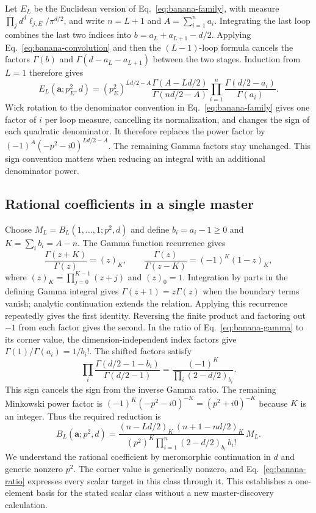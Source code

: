 Let $E_L$ be the Euclidean version of Eq.~\eqref{eq:banana-family}, with
measure $\prod_j d^d\ell_{j,E}/\pi^{d/2}$, and write $n=L+1$ and
$A=\sum_{i=1}^{n}a_i$. Integrating the last loop combines
the last two indices into $b=a_L+a_{L+1}-d/2$. Applying
Eq.~\eqref{eq:banana-convolution} and then the $(L-1)$-loop formula cancels
the factors $\Gamma(b)$ and $\Gamma(d-a_L-a_{L+1})$ between the two stages.
Induction from $L=1$ therefore gives
\begin{equation}
 E_L(\boldsymbol a;p_E^2,d)=
 (p_E^2)^{Ld/2-A}
 \frac{\Gamma(A-Ld/2)}{\Gamma(nd/2-A)}
 \prod_{i=1}^{n}\frac{\Gamma(d/2-a_i)}{\Gamma(a_i)}.
 \label{eq:banana-gamma}
\end{equation}
Wick rotation to the denominator convention in Eq.~\eqref{eq:banana-family}
gives one factor of $i$ per loop measure, cancelling its normalization,
and changes the sign of each quadratic denominator. It therefore
replaces the power factor by $(-1)^A(-p^2-i0)^{Ld/2-A}$. The remaining
Gamma factors stay unchanged. This sign convention matters when reducing
an integral with an additional denominator power.

\subsection{Rational coefficients in a single master}
Choose $M_L=B_L(1,\ldots,1;p^2,d)$ and define $b_i=a_i-1\geq0$ and
$K=\sum_i b_i=A-n$. The Gamma function recurrence gives
\begin{equation}
 \frac{\Gamma(z+K)}{\Gamma(z)}=(z)_K,\qquad
 \frac{\Gamma(z)}{\Gamma(z-K)}=(-1)^K(1-z)_K,
\end{equation}
where $(z)_K=\prod_{j=0}^{K-1}(z+j)$ and $(z)_0=1$. Integration by parts
in the defining Gamma integral gives $\Gamma(z+1)=z\Gamma(z)$ when the
boundary terms vanish; analytic continuation extends the relation.
Applying this recurrence repeatedly gives the first identity. Reversing the
finite product and factoring out $-1$ from each factor gives the second.
In the ratio of Eq.~\eqref{eq:banana-gamma} to its corner value, the
dimension-independent index factors give $\Gamma(1)/\Gamma(a_i)=1/b_i!$.
The shifted factors satisfy
\begin{equation}
 \prod_i\frac{\Gamma(d/2-1-b_i)}{\Gamma(d/2-1)}
   =\frac{(-1)^K}{\prod_i(2-d/2)_{b_i}}.
\end{equation}
This sign cancels the sign from the inverse Gamma ratio. The remaining
Minkowski power factor is
$(-1)^K(-p^2-i0)^{-K}=(p^2+i0)^{-K}$ because $K$ is an integer.
Thus the required reduction is
\begin{equation}
 \boxed{\displaystyle
 B_L(\boldsymbol a;p^2,d)=
 \frac{(n-Ld/2)_K\,(n+1-nd/2)_K}
 {(p^2)^K\prod_{i=1}^{n}(2-d/2)_{b_i}\,b_i!}\,M_L.}
 \label{eq:banana-ratio}
\end{equation}
We understand the rational coefficient by meromorphic continuation in $d$
and generic nonzero $p^2$. The corner value is generically nonzero, and
Eq.~\eqref{eq:banana-ratio} expresses every scalar target in this class
through it. This establishes a one-element basis for the stated scalar
class without a new master-discovery calculation.

